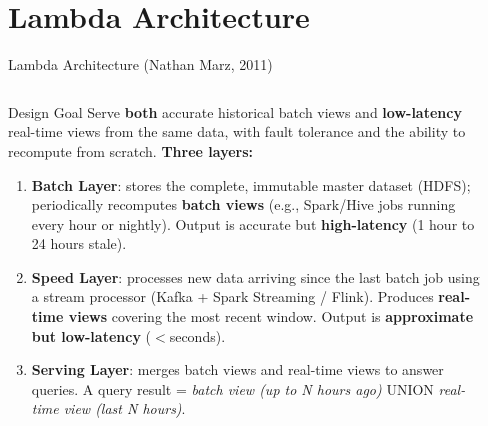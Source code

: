 \documentclass[aspectratio=169,10pt]{beamer}
\begin{document}
\section{Lambda Architecture}

\begin{frame}{Lambda Architecture (Nathan Marz, 2011)}
  \begin{columns}[T]
      \begin{block}{Design Goal}
        Serve \textbf{both} accurate historical batch views and \textbf{low-latency} real-time views from the same data, with fault tolerance and the ability to recompute from scratch.
        \vspace{4pt}
        \textbf{Three layers:}
        \begin{enumerate}
          \item \textbf{Batch Layer}: stores the complete, immutable master dataset (HDFS); periodically recomputes \textbf{batch views} (e.g., Spark/Hive jobs running every hour or nightly).  Output is accurate but \textbf{high-latency} (1 hour to 24 hours stale).
          \item \textbf{Speed Layer}: processes new data arriving since the last batch job using a stream processor (Kafka + Spark Streaming / Flink).  Produces \textbf{real-time views} covering the most recent window.  Output is \textbf{approximate but low-latency} ($<$seconds).
          \item \textbf{Serving Layer}: merges batch views and real-time views to answer queries.  A query result = \textit{batch view (up to N hours ago)} UNION \textit{real-time view (last N hours)}.
        \end{enumerate}
      \end{block}

      \begin{center}
\end{center}
\end{columns}
\end{frame}
\end{document}
